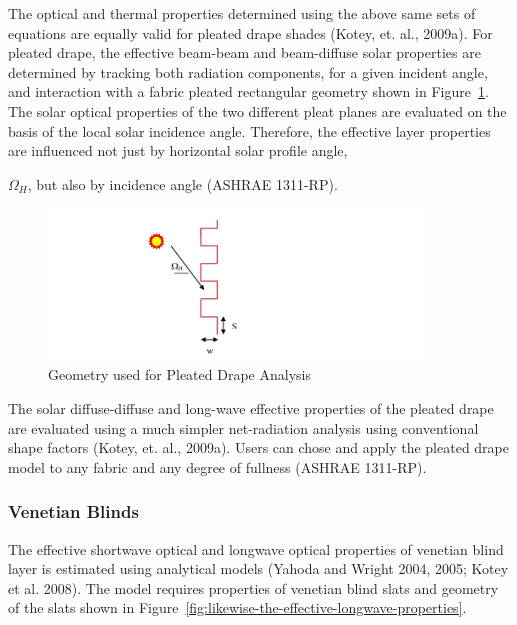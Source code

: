 The optical and thermal properties determined using the above same sets of equations are equally valid for pleated drape shades (Kotey, et. al., 2009a). For pleated drape, the effective beam-beam and beam-diffuse solar properties are determined by tracking both radiation components, for a given incident angle, and interaction with a fabric pleated rectangular geometry shown in Figure~\ref{fig:geometry-used-for-pleated-drape-analysis}. The solar optical properties of the two different pleat planes are evaluated on the basis of the local solar incidence angle. Therefore, the effective layer properties are influenced not just by horizontal solar profile angle, {$\Omega$\(_{H}\), but also by incidence angle (ASHRAE 1311-RP).

\begin{figure}[hbtp] %
\centering
\includegraphics[width=0.9\textwidth, height=0.9\textheight, keepaspectratio=true]{media/image1844.svg.png}
\caption{Geometry used for Pleated Drape Analysis \protect \label{fig:geometry-used-for-pleated-drape-analysis}}
\end{figure}

The solar diffuse-diffuse and long-wave effective properties of the pleated drape are evaluated using a much simpler net-radiation analysis using conventional shape factors (Kotey, et. al., 2009a). Users can chose and apply the pleated drape model to any fabric and any degree of fullness (ASHRAE 1311-RP).

\subsubsection{Venetian Blinds}\label{venetian-blinds}

The effective shortwave optical and longwave optical properties of venetian blind layer is estimated using analytical models (Yahoda and Wright 2004, 2005; Kotey et al. 2008). The model requires properties of venetian blind slats and geometry of the slats shown in Figure~\ref{fig:likewise-the-effective-longwave-properties}.

}
